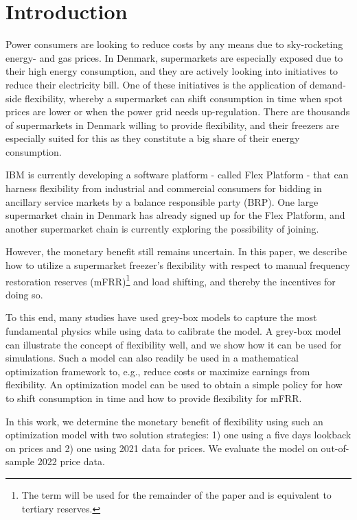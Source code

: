 \section{Introduction}

Power consumers are looking to reduce costs by any means due to sky-rocketing energy- and gas prices. In Denmark, supermarkets are especially exposed due to their high energy consumption, and they are actively looking into initiatives to reduce their electricity bill. One of these initiatives is the application of demand-side flexibility, whereby a supermarket can shift consumption in time when spot prices are lower or when the power grid needs up-regulation. There are thousands of supermarkets in Denmark willing to provide flexibility, and their freezers are especially suited for this as they constitute a big share of their energy consumption.

IBM is currently developing a software platform - called Flex Platform - that can harness flexibility from industrial and commercial consumers for bidding in ancillary service markets by a balance responsible party (BRP). One large supermarket chain in Denmark has already signed up for the Flex Platform, and another supermarket chain is currently exploring the possibility of joining.

However, the monetary benefit still remains uncertain. In this paper, we describe how to utilize a supermarket freezer's flexibility with respect to manual frequency restoration reserves (mFRR)\footnote{The term will be used for the remainder of the paper and is equivalent to tertiary reserves.} and load shifting, and thereby the incentives for doing so.

To this end, many studies have used grey-box models to capture the most fundamental physics while using data to calibrate the model. A grey-box model can illustrate the concept of flexibility well, and we show how it can be used for simulations. Such a model can also readily be used in a mathematical optimization framework to, e.g., reduce costs or maximize earnings from flexibility. An optimization model can be used to obtain a simple policy for how to shift consumption in time and how to provide flexibility for mFRR.

In this work, we determine the monetary benefit of flexibility using such an optimization model with two solution strategies: 1) one using a five days lookback on prices and 2) one using 2021 data for prices. We evaluate the model on out-of-sample 2022 price data.

